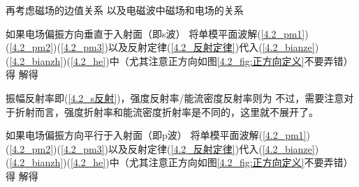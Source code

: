     再考虑磁场的边值关系
    以及电磁波中磁场和电场的关系
    
    如果电场偏振方向垂直于入射面（即s波）   将单模平面波解(\ref{4.2_pm1})(\ref{4.2_pm2})(\ref{4.2_pm3})以及反射定律(\ref{4.2_反射定律})代入(\ref{4.2_bianze})(\ref{4.2_bianzh})(\ref{4.2_he})中（尤其注意正方向如图\ref{4.2_fig:正方向定义}不要弄错）得
    解得
    
    振幅反射率即(\ref{4.2_s反射})，强度反射率/能流密度反射率则为
    不过，需要注意对于折射而言，强度折射率和能流密度折射率是不同的，这里就不展开了。
    
    如果电场偏振方向平行于入射面（即p波）   将单模平面波解(\ref{4.2_pm1})(\ref{4.2_pm2})(\ref{4.2_pm3})以及反射定律(\ref{4.2_反射定律})代入(\ref{4.2_bianze})(\ref{4.2_bianzh})(\ref{4.2_he})中（尤其注意正方向如图\ref{4.2_fig:正方向定义}不要弄错）得
    解得
    
